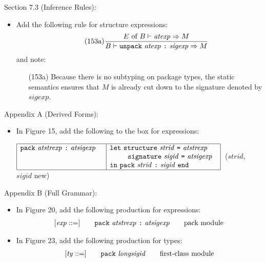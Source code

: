 \documentclass[twoside,titlepage]{article}
\begin{document}
\begin{appendix}
Section 7.3 (Inference Rules):
\begin{itemize}
\item Add the following rule for structure expressions:
  \begin{equation}
  \tag{153a}
  \frac{
  E~\mbox{of}~B \vdash \mathit{atexp} \Rightarrow M
  }{
  B \vdash {\tt{unpack}}~\mathit{atexp}~\mbox{\tt:}~\mathit{sigexp} \Rightarrow M
  }
  \end{equation}
  and note:
  \begin{enumerate}
  \item[(153a)] Because there is no subtyping on package types, the static semantics ensures that $M$ is already cut down to the signature denoted by $\mathit{sigexp}$.
  \end{enumerate}
\end{itemize}

Appendix A (Derived Forms):
\begin{itemize}
\item In Figure 15, add the following to the box for expressions:

  $\begin{array}{|l|l|}
  \hline
  {\tt{pack}}~\mathit{atstrexp}~\mbox{\tt:}~\mathit{atsigexp}~~~
  & {\tt{let}}~{\tt{structure}}~\mathit{strid}~\mbox{\tt=}~\mathit{atstrexp}~~\\
  & ~~~~~~~\,{\tt{signature}}~\mathit{sigid}~\mbox{\tt=}~\mathit{atsigexp}~~\\
  & {\tt{in}}~{\tt{pack}}~\mathit{strid}~\mbox{\tt:}~\mathit{sigid}~{\tt{end}} \\
  \hline
  \end{array}$~($\mathit{strid}$, $\mathit{sigid}$ new)
\end{itemize}

Appendix B (Full Grammar):
\begin{itemize}
\item In Figure 20, add the following production for expressions:
  $$
  \begin{array}{l@{\qquad}l@{\qquad}l}
  [\mathit{exp} ::=] & {\tt{pack}}~\mathit{atstrexp}~\mbox{\tt:}~\mathit{atsigexp} & \textrm{pack module} \\
  \end{array}
  $$

\item In Figure 23, add the following production for types:
  $$
  \begin{array}{l@{\qquad}l@{\qquad}l}
  [\mathit{ty} ::=] & {\tt{pack}}~\mathit{longsigid} & \textrm{first-class module} \\
  \end{array}
  $$


\end{itemize}
\end{appendix}
\end{document}
